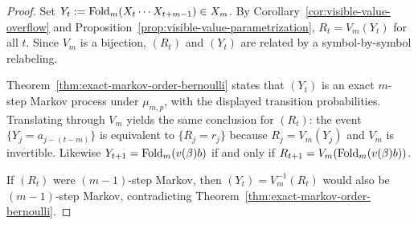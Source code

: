 \begin{proof}
Set $Y_t:=\operatorname{Fold}_m(X_t\cdots X_{t+m-1})\in X_m$.  By
Corollary~\ref{cor:visible-value-overflow} and
Proposition~\ref{prop:visible-value-parametrization}, $R_t=V_m(Y_t)$ for all $t$.
Since $V_m$ is a bijection, $(R_t)$ and $(Y_t)$ are related by a
symbol-by-symbol relabeling.

Theorem~\ref{thm:exact-markov-order-bernoulli} states that $(Y_t)$ is an exact
$m$-step Markov process under $\mu_{m,p}$, with the displayed transition
probabilities.  Translating through $V_m$ yields the same conclusion for
$(R_t)$: the event $\{Y_j=a_{j-(t-m)}\}$ is equivalent to $\{R_j=r_j\}$
because $R_j=V_m(Y_j)$ and $V_m$ is invertible.  Likewise
$Y_{t+1}=\operatorname{Fold}_m(v(\beta)b)$ if and only if
$R_{t+1}=V_m(\operatorname{Fold}_m(v(\beta)b))$.

If $(R_t)$ were $(m-1)$-step Markov, then $(Y_t)=V_m^{-1}(R_t)$ would also be
$(m-1)$-step Markov, contradicting
Theorem~\ref{thm:exact-markov-order-bernoulli}.
\end{proof}
